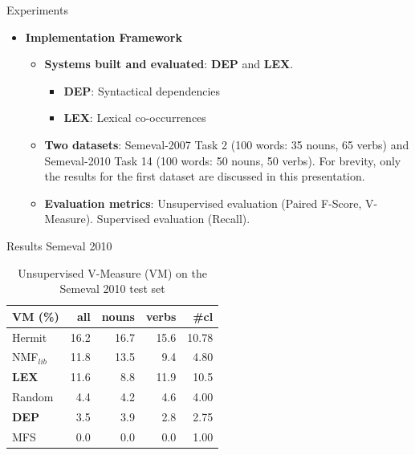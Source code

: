 \documentclass[10pt,xcolor=table]{beamer}
\begin{document}
\begin{frame}{Experiments}
\begin{itemize}
	\item \textbf{Implementation Framework}
	
	\begin{itemize}
	
		\item \textbf{Systems built and evaluated}: \textbf{DEP} and \textbf{LEX}.
		\begin{itemize}
			\item \textbf{DEP}: Syntactical dependencies
			\item \textbf{LEX}: Lexical co-occurrences 
			
		\end{itemize}
	
		\item \textbf{Two datasets}: Semeval-2007 Task 2 (100 words: 35 nouns, 65 verbs) and Semeval-2010 Task 14 (100 words: 50 nouns, 50 verbs). For brevity, only the results for the first dataset are discussed in this presentation.
		\item \textbf{Evaluation metrics}: Unsupervised evaluation (Paired F-Score, V-Measure). Supervised evaluation (Recall).


	\end{itemize}
	

\end{itemize}
\end{frame}

\begin{frame}{Results Semeval 2010}
\begin{table}[]
\centering

\begin{tabular}{@{}lrrrr@{}}
\toprule
\textbf{VM (\%)} & \textbf{all} & \textbf{nouns} & \textbf{verbs} & \textbf{\#cl} \\ \midrule
{Hermit} & 16.2 & 16.7 & 15.6 & 10.78 \\
NMF$_{lib}$&11.8&13.5&9.4&4.80\\
\textbf{LEX} & 11.6 & 8.8 & 11.9 & 10.5 \\
Random & 4.4 & 4.2 & 4.6 & 4.00 \\
\textbf{DEP} & 3.5 & 3.9 & 2.8 & 2.75 \\
MFS & 0.0 & 0.0 & 0.0 & 1.00 \\ \bottomrule
\end{tabular}
\caption{Unsupervised V-Measure (VM) on the Semeval 2010 test set}
\label{tab:sem2010_VM}
\end{table}


\end{frame}
\end{document}
